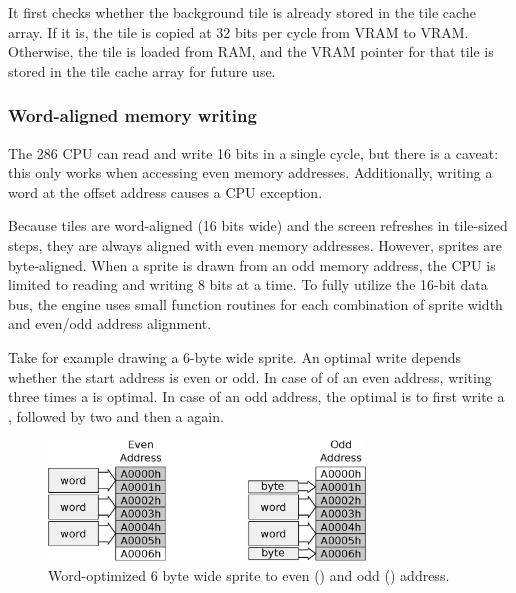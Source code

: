 \documentclass[book.tex]{subfiles}
\begin{document}
\par
It first checks whether the background tile is already stored in the tile cache array. If it is, the tile is copied at 32 bits per cycle from VRAM to VRAM. Otherwise, the tile is loaded from RAM, and the VRAM pointer for that tile is stored in the tile cache array for future use.


\subsubsection{Word-aligned memory writing}
The 286 CPU can read and write 16 bits in a single cycle, but there is a caveat: this only works when accessing even memory addresses. Additionally, writing a word at the offset address  causes a CPU exception.\\

\par
Because tiles are word-aligned (16 bits wide) and the screen refreshes in tile-sized steps, they are always aligned with even memory addresses. However, sprites are byte-aligned. When a sprite is drawn from an odd memory address, the CPU is limited to reading and writing 8 bits at a time. To fully utilize the 16-bit data bus, the engine uses small function routines for each combination of sprite width and even/odd address alignment.\\

\par
Take for example drawing a 6-byte wide sprite. An optimal write depends whether the start address is even or odd. In case of of an even address, writing three times a  is optimal. In case of an odd address, the optimal is to first write a , followed by two  and then a  again.\\

\begin{figure}[H]
  \centering
  \includegraphics[width=0.75\textwidth]{imgs/drawings/mask_block.eps}
  \caption{Word-optimized 6 byte wide sprite to even () and odd () address.}
  \label{fig:mask_block}  
\end{figure}
\end{document}

